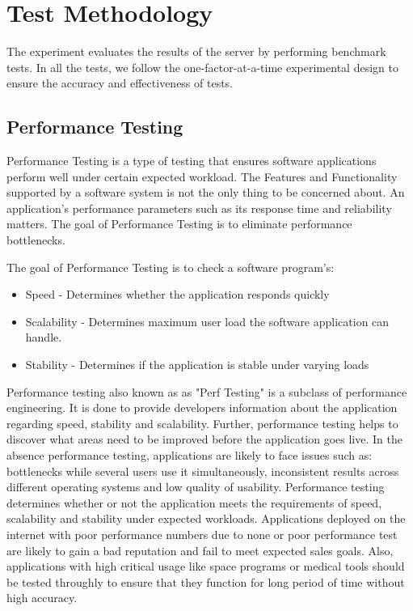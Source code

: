 \documentclass[../thesis.tex]{subfiles}
\begin{document}
	\section{Test Methodology}
	The experiment evaluates the results of the server by performing benchmark tests. In all the tests, we follow the one-factor-at-a-time experimental design \cite{oaat} to ensure the accuracy and effectiveness of tests.
	
	\subsection{Performance Testing}
	Performance Testing is a type of testing that ensures software applications perform well under certain expected workload. The Features and Functionality supported by a software system is not the only thing to be concerned about. An application's performance parameters such as its response time and reliability matters. The goal of Performance Testing is to eliminate performance bottlenecks.
	\newline

	The goal of Performance Testing is to check a software program's:
 
	\begin{itemize}
		\item Speed - Determines whether the application responds quickly

		\item Scalability - Determines maximum user load the software application can handle.

		\item Stability - Determines if the application is stable under varying loads
	\end{itemize}

	Performance testing also known as as "Perf Testing" is a subclass of performance engineering. It is done to provide developers information about the application regarding speed, stability and scalability. Further, performance testing helps to discover what areas need to be improved before the application goes live. In the absence performance testing, applications are likely to face issues such as: bottlenecks while several users use it simultaneously, inconsistent results across different operating systems and low quality of usability. Performance testing determines whether or not the application meets the requirements of speed, scalability and stability under expected workloads. Applications deployed on the internet with poor performance numbers due to none or poor performance test are likely to gain a bad reputation and fail to meet expected sales goals. Also, applications with high critical usage like space programs or medical tools should be tested throughly to ensure that they function for long period of time without high accuracy.
\end{document}
